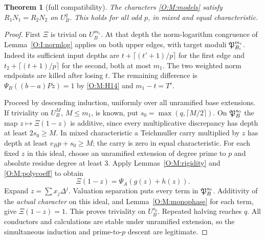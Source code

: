 \documentclass[11pt]{amsart}
\newtheorem{theorem}{Theorem}[section]
\theoremstyle{definition}
\theoremstyle{remark}
\begin{document}
\begin{theorem}[full compatibility]\label{O:M:compat}
The characters \eqref{O:M:models} satisfy $R_1N_1=R_2N_2$ on $U_B^q$.
This holds for all odd $p$, in mixed and equal characteristic.
\end{theorem}
\begin{proof}
First $\Xi$ is trivial on $U_B^{m_1}$. At that depth the norm-logarithm
congruence of Lemma~\ref{O:I:normlog} applies on both upper edges, with target moduli
$\mathfrak P_{B_i}^{m_i}$. Indeed its sufficient input depths are
$t+\lceil(t'+1)/p\rceil$ for the first edge and
$t_2+\lceil(t+1)/p\rceil$ for the second, both at most $m_1$.
The two weighted norm endpoints are killed after losing $t$.
The remaining difference is
$\Psi_B((b-a)Pz)=1$ by \eqref{O:M:H14} and $m_1-t=T'$.

Proceed by descending induction, uniformly over all unramified base
extensions. If triviality on $U_B^M$, $M\le m_1$, is known, put
$s_0=\max(q,\lceil M/2\rceil)$. On $\mathfrak P_B^{s_0}$ the map
$z\mapsto\Xi(1-z)$ is additive, since every multiplicative discrepancy
has depth at least $2s_0\ge M$. In mixed characteristic a Teichmuller carry
multiplied by $z$ has depth at least $v_Bp+s_0\ge M$; the carry is zero
in equal characteristic. For each fixed $z$ in this ideal, choose an
unramified extension of degree prime to $p$ and absolute residue degree at
least $3$. Apply Lemmas~\ref{O:M:rigidity} and \ref{O:M:polycoeff} to obtain
\[
 \Xi(1-z)=\Psi_A(g(z)+h(z)).
\]
Expand $z=\sum x_j\Delta^j$. Valuation separation puts every term in
$\mathfrak P_B^{s_0}$. Additivity of the \emph{actual character} on this ideal,
and Lemma~\ref{O:M:monophase} for each term, give $\Xi(1-z)=1$.
This proves triviality on $U_B^{s_0}$. Repeated halving reaches $q$.
All conductors and calculations are stable under unramified extension,
so the simultaneous induction and prime-to-$p$ descent are legitimate.
\end{proof}
\end{document}
